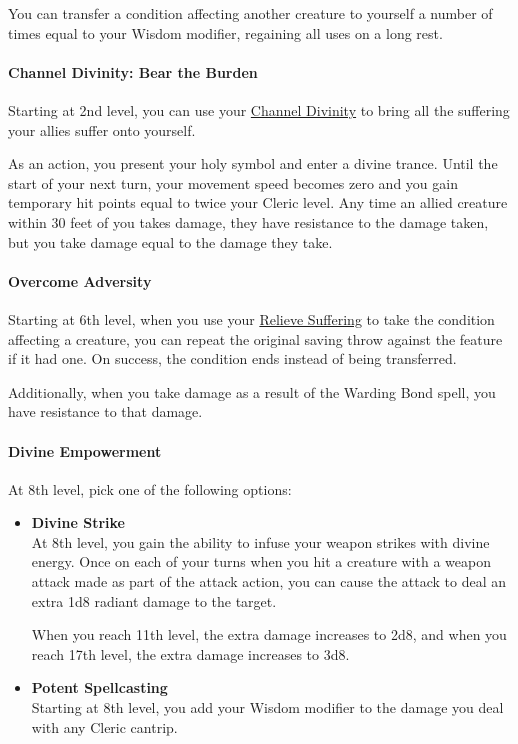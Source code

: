 You can transfer a condition affecting another creature to yourself a
number of times equal to your Wisdom modifier, regaining all uses on a
long rest.

\paragraph{Channel Divinity: Bear the
Burden}\label{Martyr_Domain_channel-divinity-bear-the-burden}

Starting at 2nd level, you can use your
\hyperref[Cleric_channel-divinity]{Channel Divinity} to bring all the
suffering your allies suffer onto yourself.

As an action, you present your holy symbol and enter a divine trance.
Until the start of your next turn, your movement speed becomes zero and
you gain temporary hit points equal to twice your Cleric level. Any time
an allied creature within 30 feet of you takes damage, they have
resistance to the damage taken, but you take damage equal to the damage
they take.

\paragraph{Overcome Adversity}\label{Martyr_Domain_overcome-adversity}

Starting at 6th level, when you use your
\hyperref[Martyr_Domain_relieve-suffering]{Relieve Suffering} to take
the condition affecting a creature, you can repeat the original saving
throw against the feature if it had one. On success, the condition ends
instead of being transferred.

Additionally, when you take damage as a result of the Warding Bond
spell, you have resistance to that damage.

\paragraph{Divine Empowerment}\label{Martyr_Domain_divine-empowerment}

At 8th level, pick one of the following options:

\begin{itemize}
\item
  \textbf{Divine Strike}\\
  At 8th level, you gain the ability to infuse your weapon strikes with
  divine energy. Once on each of your turns when you hit a creature with
  a weapon attack made as part of the attack action, you can cause the
  attack to deal an extra 1d8 radiant damage to the target.

  When you reach 11th level, the extra damage increases to 2d8, and when
  you reach 17th level, the extra damage increases to 3d8.
\item
  \textbf{Potent Spellcasting}\\
  Starting at 8th level, you add your Wisdom modifier to the damage you
  deal with any Cleric cantrip.
\end{itemize}

